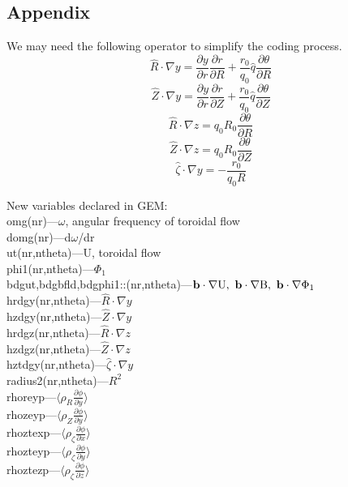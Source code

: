 \documentclass[12pt]{article}
\begin{document}
\begin{CJK*}{UTF8}{gbsn}
\newpage
\section*{Appendix}\label{app}
We may need the following operator to simplify the coding process.
\begin{equation*}
    \hat{R}\cdot\nabla y = \frac{\partial y}{\partial r}\frac{\partial r}{\partial R} + \frac{r_0}{q_0}\hat{q}\frac{\partial \theta}{\partial R}
\end{equation*}
\begin{equation*}
    \hat{Z}\cdot\nabla y = \frac{\partial y}{\partial r}\frac{\partial r}{\partial Z} + \frac{r_0}{q_0}\hat{q}\frac{\partial \theta}{\partial Z}
\end{equation*}
\begin{equation*}
    \hat{R}\cdot\nabla z = q_0R_0\frac{\partial \theta}{\partial R}
\end{equation*}
\begin{equation*}
    \hat{Z}\cdot\nabla z = q_0R_0\frac{\partial \theta}{\partial Z}
\end{equation*}
\begin{equation*}
    \hat{\zeta}\cdot\nabla y = -\frac{r_0}{q_0R}
\end{equation*}

New variables declared in GEM:\\
omg(nr)---$\omega$, angular frequency of toroidal flow\\
domg(nr)---d$\omega$/dr\\
ut(nr,ntheta)---U, toroidal flow\\
phi1(nr,ntheta)---$\Phi_1$\\
bdgut,bdgbfld,bdgphi1::(nr,ntheta)---${\bf b}\cdot\nabla{\rm U},\ {\bf b}\cdot\nabla{\rm B},\ {\bf b}\cdot\nabla{\rm \Phi_1}$\\
hrdgy(nr,ntheta)---$\hat{R}\cdot\nabla y$\\
hzdgy(nr,ntheta)---$\hat{Z}\cdot\nabla y$\\
hrdgz(nr,ntheta)---$\hat{R}\cdot\nabla z$\\
hzdgz(nr,ntheta)---$\hat{Z}\cdot\nabla z$\\
hztdgy(nr,ntheta)---$\hat{\zeta}\cdot\nabla y$\\
radius2(nr,ntheta)---$R^2$\\
rhoreyp---$\big\langle\rho_R\frac{\partial\phi}{\partial y}\big\rangle$\\
rhozeyp---$\big\langle\rho_Z\frac{\partial\phi}{\partial y}\big\rangle$\\
rhoztexp---$\big\langle\rho_\zeta\frac{\partial\phi}{\partial x}\big\rangle$\\
rhozteyp---$\big\langle\rho_\zeta\frac{\partial\phi}{\partial y}\big\rangle$\\
rhoztezp---$\big\langle\rho_\zeta\frac{\partial\phi}{\partial z}\big\rangle$\\

\newpage


\end{CJK*}
\end{document}
